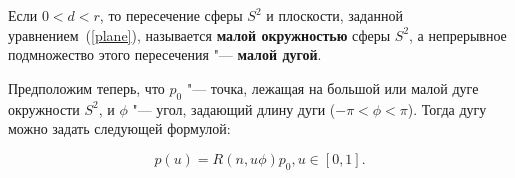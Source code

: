 \begin{definition}
Если $0<d<r$, то пересечение сферы $S^2$ и плоскости, заданной уравнением~(\ref{plane}), называется \textbf{малой
окружностью} сферы $S^2$, а непрерывное подмножество этого пересечения "--- \textbf{малой дугой}.
\end{definition}

Предположим теперь, что $p_0$ "--- точка, лежащая на большой или малой дуге окружности $S^2$, и $\phi$ "--- угол,
задающий длину дуги ($-\pi < \phi < \pi$). Тогда дугу можно задать следующей формулой:

$$
p(u)=R(n,u\phi)p_0, u \in [0,1].
$$
